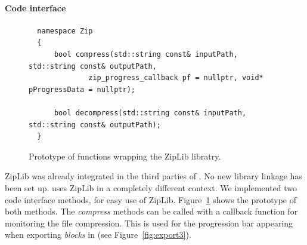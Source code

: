 \paragraph{Code interface}
\begin{figure}
  \centering
  \begin{lstlisting}
  namespace Zip
  {
      bool compress(std::string const& inputPath, std::string const& outputPath,
              zip_progress_callback pf = nullptr, void* pProgressData = nullptr);

      bool decompress(std::string const& inputPath, std::string const& outputPath);
  }
  \end{lstlisting}
  \caption{Prototype of functions wrapping the ZipLib libratry.}
  \label{fig:code-interface}
\end{figure}
ZipLib was already integrated in the third parties of \CC. No new library linkage has been set up. \CC uses ZipLib in a completely different context. We implemented two code interface methods, for easy use of ZipLib. Figure~\ref{fig:code-interface} shows the prototype of both methods. The  \emph{compress} methods can be called with a callback function for monitoring the file compression. This is used for the progression bar appearing when exporting  \emph{blocks} in \CC (see Figure~\ref{fig:export3}).


